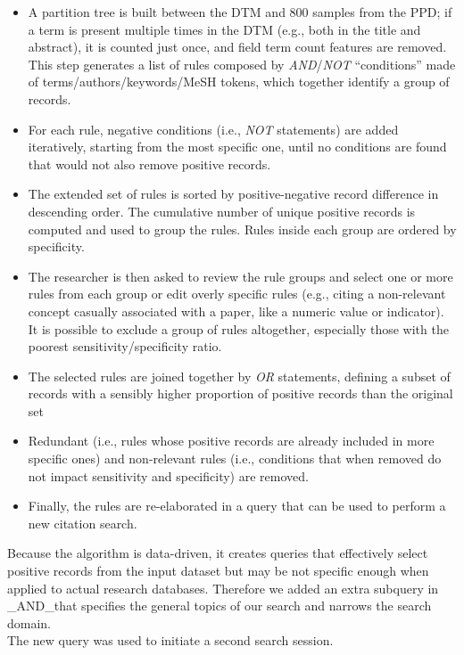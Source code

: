 \documentclass[]{bmcart}
\providecommand{\tightlist}{ %
  \setlength{\itemsep}{0pt}\setlength{\parskip}{0pt}
  }
\begin{document}
\begin{itemize}
\tightlist
\item
  A partition tree \citep{rpart} is built between the DTM and 800
  samples from the PPD; if a term is present multiple times in the DTM
  (e.g., both in the title and abstract), it is counted just once, and
  field term count features are removed. This step generates a list of
  rules composed by \emph{AND}/\emph{NOT} ``conditions'' made of
  terms/authors/keywords/MeSH tokens, which together identify a group of
  records.
\item
  For each rule, negative conditions (i.e., \emph{NOT} statements) are
  added iteratively, starting from the most specific one, until no
  conditions are found that would not also remove positive records.
\item
  The extended set of rules is sorted by positive-negative record
  difference in descending order. The cumulative number of unique
  positive records is computed and used to group the rules. Rules inside
  each group are ordered by specificity.
\item
  The researcher is then asked to review the rule groups and select one
  or more rules from each group or edit overly specific rules (e.g.,
  citing a non-relevant concept casually associated with a paper, like a
  numeric value or indicator). It is possible to exclude a group of
  rules altogether, especially those with the poorest
  sensitivity/specificity ratio.
\item
  The selected rules are joined together by \emph{OR} statements,
  defining a subset of records with a sensibly higher proportion of
  positive records than the original set
\item
  Redundant (i.e., rules whose positive records are already included in
  more specific ones) and non-relevant rules (i.e., conditions that when
  removed do not impact sensitivity and specificity) are removed.
\item
  Finally, the rules are re-elaborated in a query that can be used to
  perform a new citation search.
\end{itemize}

Because the algorithm is data-driven, it creates queries that
effectively select positive records from the input dataset but may be
not specific enough when applied to actual research databases. Therefore
we added an extra subquery in \_AND\_that specifies the general topics
of our search and narrows the search domain.\\
The new query was used to initiate a second search session.
\end{document}
